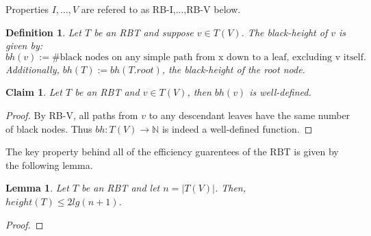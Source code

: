 \documentclass[10pt]{article}
\newtheorem{lemma}{Lemma}[section]
\newtheorem{definition}{Definition}[section]
\newtheorem{claim}{Claim}[section]
\begin{document}
Properties $I,\ldots, V$ are refered to as RB-I,...,RB-V below.

\begin{definition}
  Let $T$ be an RBT and suppose $v \in T(V)$. The \emph{black-height} of
  $v$ is given by:
    \[ bh(v) := \#\text{black nodes on any simple path from x down to a leaf,
      excluding v itself.} \]
  Additionally, $bh(T) := bh(T.root)$, the black-height of the root node.
\end{definition}

\begin{claim}
  Let $T$ be an RBT and $v \in T(V)$, then $bh(v)$ is \emph{well-defined}.
\end{claim}

\begin{proof}
  By RB-V, all paths from $v$ to any descendant leaves
  have the same number of black nodes.
  Thus $bh : T(V) \rightarrow \mathbb{N}$ is indeed a well-defined function.
\end{proof}

The key property behind all of the efficiency guarentees of the RBT is
given by the following lemma.

\begin{lemma}
  \label{rbt-height}
  Let $T$ be an RBT and let $n = |T(V)|$. Then, $height(T) \leq 2lg(n + 1)$.
\end{lemma}

\begin{proof}

\end{proof}
\end{document}
